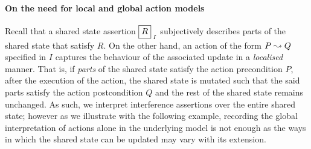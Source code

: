 \paragraph{On the need for local and global action models}
\label{subsec:localGlobalActionModels}

Recall that a shared state assertion $\shared{R}{I}$ subjectively describes parts of the shared state that satisfy $R$. On the other hand, an action of the form $P \mathrel{\leadsto} Q$ specified in $I$ captures the behaviour of the associated update in a \emph{localised} manner. That is, if \emph{parts} of the shared state satisfy the action precondition $P$, after the execution of the action, the shared state is mutated such that the said parts satisfy the action postcondition $Q$ and the rest of the shared state remains unchanged. As such, we interpret interference assertions over the entire shared state; however as we illustrate with the following example, recording the global interpretation of actions alone in the underlying model is not enough as the ways in which the shared state can be updated may vary with its extension. 
